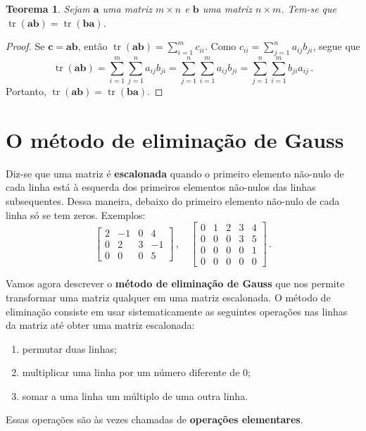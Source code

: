 \documentclass[12pt,a4paper]{report}
\newcommand{\mb}{\mathbf}
\newtheorem{thm}{Teorema}[chapter]
\DeclareMathOperator{\tr}{tr}
\begin{document}
\begin{thm}
  Sejam $\mb a$ uma matriz $m\times n$ e $\mb b$ uma matriz $n\times m$. Tem-se que $\tr(\mb {ab})=\tr(\mb{ba})$.
\end{thm}
\begin{proof}
  Se $\mb c=\mb a\mb b$, então $\tr(\mb {ab})=\sum_{i=1}^m c_{ii}$. Como $c_{ii}=\sum_{j=1}^na_{ij}b_{ji}$, segue que
  $$\tr(\mb{ab})=\sum_{i=1}^m\sum_{j=1}^na_{ij}b_{ji}=\sum_{j=1}^n\sum_{i=1}^ma_{ij}b_{ji}=\sum_{j=1}^n\sum_{i=1}^mb_{ji}a_{ij}\,.$$
  Portanto, $\tr(\mb{ab})=\tr(\mb{ba})$.
\end{proof}

\chapter{O método de eliminação de Gauss}

Diz-se que uma matriz é \textbf{escalonada} quando o primeiro elemento não-nulo de cada linha está à esquerda dos primeiros elementos não-nulos das linhas subsequentes. Dessa maneira, debaixo do primeiro elemento não-nulo de cada linha só se tem zeros. Exemplos:
$$\begin{bmatrix}
  2&-1&0&4\\
  0&2&3&-1\\
  0&0&0&5
\end{bmatrix}\,,\quad \begin{bmatrix}
  0&1&2&3&4\\
  0&0&0&3&5\\
  0&0&0&0&1\\
  0&0&0&0&0
\end{bmatrix}\,.$$

Vamos agora descrever o \textbf{método de eliminação de Gauss} que nos permite transformar uma matriz qualquer em uma matriz escalonada. O método de eliminação consiste em usar sistematicamente as seguintes operações nas linhas da matriz até obter uma matriz escalonada:
\begin{enumerate}
  \item permutar duas linhas;
  \item multiplicar uma linha por um número diferente de $0$;
  \item somar a uma linha um múltiplo de uma outra linha.
\end{enumerate}
Essas operações são às vezes chamadas de \textbf{operações elementares}.
\end{document}
